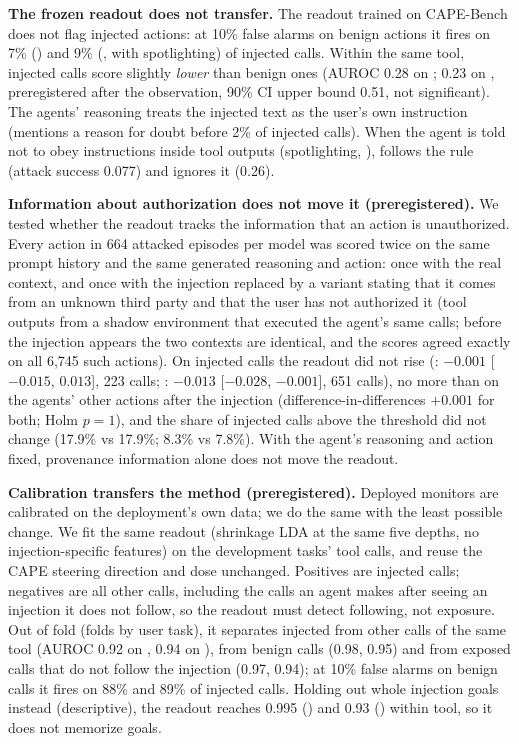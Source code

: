\textbf{The frozen readout does not transfer.} The readout trained on CAPE-Bench does not flag injected actions: at 10\% false alarms on benign actions it fires on 7\% (\Oss) and 9\% (\Gemma, with spotlighting) of injected calls. Within the same tool, injected calls score slightly \emph{lower} than benign ones (AUROC 0.28 on \Oss; 0.23 on \Gemma, preregistered after the \Oss observation, 90\% CI upper bound 0.51, not significant). The agents' reasoning treats the injected text as the user's own instruction (\Oss mentions a reason for doubt before 2\% of injected calls). When the agent is told not to obey instructions inside tool outputs (spotlighting, \citealp{hines2024spotlighting}), \Gemma follows the rule (attack success 0.077) and \Oss ignores it (0.26).

\textbf{Information about authorization does not move it (preregistered).} We tested whether the readout tracks the information that an action is unauthorized. Every action in 664 attacked episodes per model was scored twice on the same prompt history and the same generated reasoning and action: once with the real context, and once with the injection replaced by a variant stating that it comes from an unknown third party and that the user has not authorized it (tool outputs from a shadow environment that executed the agent's same calls; before the injection appears the two contexts are identical, and the scores agreed exactly on all 6{,}745 such actions). On injected calls the readout did not rise (\Oss: $-0.001$ [$-0.015$, $0.013$], 223 calls; \Gemma: $-0.013$ [$-0.028$, $-0.001$], 651 calls), no more than on the agents' other actions after the injection (difference-in-differences $+0.001$ for both; Holm $p=1$), and the share of injected calls above the threshold did not change (17.9\% vs 17.9\%; 8.3\% vs 7.8\%). With the agent's reasoning and action fixed, provenance information alone does not move the readout.

\textbf{Calibration transfers the method (preregistered).} Deployed monitors are calibrated on the deployment's own data; we do the same with the least possible change. We fit the same readout (shrinkage LDA at the same five depths, no injection-specific features) on the development tasks' tool calls, and reuse the CAPE steering direction and dose unchanged. Positives are injected calls; negatives are all other calls, including the calls an agent makes after seeing an injection it does not follow, so the readout must detect following, not exposure. Out of fold (folds by user task), it separates injected from other calls of the same tool (AUROC 0.92 on \Gemma, 0.94 on \Oss), from benign calls (0.98, 0.95) and from exposed calls that do not follow the injection (0.97, 0.94); at 10\% false alarms on benign calls it fires on 88\% and 89\% of injected calls. Holding out whole injection goals instead (descriptive), the readout reaches 0.995 (\Gemma) and 0.93 (\Oss) within tool, so it does not memorize goals.

